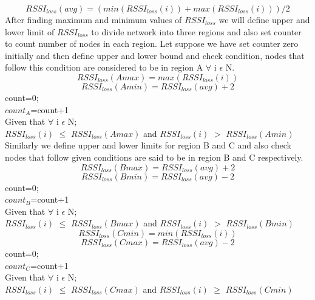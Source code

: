 \documentclass[12pt, conference, compsocconf, onecolumn, draftcls]{IEEEtran}
\begin{document}
\begin{equation}
RSSI_{loss}(avg)= (min(RSSI_{loss}(i))+max(RSSI_{loss}(i)))/2
\end{equation}
After finding maximum and minimum values of $RSSI_{loss}$ we will define upper and lower limit of $RSSI_{loss}$ to divide network into three regions and also set counter to count number of nodes in each region. Let suppose we have set counter zero initially and then define upper and lower bound and check condition, nodes that follow this condition are considered to be in region A $\forall$ i $\epsilon$ N.\\
\begin{equation}
RSSI_{loss}(Amax)= max(RSSI_{loss}(i))
\end{equation}
\begin{equation}
RSSI_{loss}(Amin)=RSSI_{loss}(avg)+2
\end{equation}
count=0;\\
$count_{A}$=count+1\\
Given that $\forall$ i $\epsilon$ N;\\
$RSSI_{loss}(i)$ $\leq$ $RSSI_{loss}(Amax)$ and $RSSI_{loss}(i)$ $>$ $RSSI_{loss}(Amin)$\\
Similarly we define upper and lower limits for region B and C and also check nodes that follow given conditions are said to be in region B and C respectively.\\
\begin{equation}
RSSI_{loss}(Bmax)=RSSI_{loss}(avg)+2
\end{equation}
\begin{equation}
RSSI_{loss}(Bmin)=RSSI_{loss}(avg)-2
\end{equation}
count=0;\\
$count_{B}$=count+1\\
Given that $\forall$ i $\epsilon$ N;\\
$RSSI_{loss}(i)$ $\leq$ $RSSI_{loss}(Bmax)$ and $RSSI_{loss}(i)$ $>$ $RSSI_{loss}(Bmin)$\\
\begin{equation}
RSSI_{loss}(Cmin)= min(RSSI_{loss}(i))
\end{equation}
\begin{equation}
RSSI_{loss}(Cmax)=RSSI_{loss}(avg)-2
\end{equation}
count=0;\\
$count_{C}$=count+1\\
Given that $\forall$ i $\epsilon$ N;\\
$RSSI_{loss}(i)$ $\leq$ $RSSI_{loss}(Cmax)$ and $RSSI_{loss}(i)$ $\geq$ $RSSI_{loss}(Cmin)$\\
\end{document}
